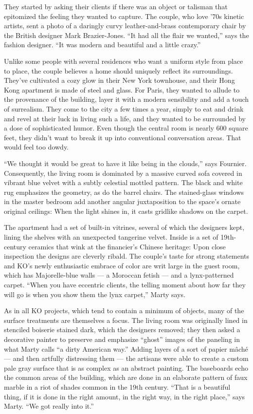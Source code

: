 They started by asking their clients if there was an object or talisman
that epitomized the feeling they wanted to capture. The couple, who love
'70s kinetic artists, sent a photo of a daringly curvy leather-and-brass
contemporary chair by the British designer Mark Brazier-Jones. ``It had
all the flair we wanted,'' says the fashion designer. ``It was modern
and beautiful and a little crazy.''

Unlike some people with several residences who want a uniform style from
place to place, the couple believes a home should uniquely reflect its
surroundings. They've cultivated a cozy glow in their New York
townhouse, and their Hong Kong apartment is made of steel and glass. For
Paris, they wanted to allude to the provenance of the building, layer it
with a modern sensibility and add a touch of surrealism. They come to
the city a few times a year, simply to eat and drink and revel at their
luck in living such a life, and they wanted to be surrounded by a dose
of sophisticated humor. Even though the central room is nearly 600
square feet, they didn't want to break it up into conventional
conversation areas. That would feel too dowdy.

``We thought it would be great to have it like being in the clouds,''
says Fournier. Consequently, the living room is dominated by a massive
curved sofa covered in vibrant blue velvet with a subtly celestial
mottled pattern. The black and white rug emphasizes the geometry, as do
the barrel chairs. The stained-glass windows in the master bedroom add
another angular juxtaposition to the space's ornate original ceilings:
When the light shines in, it casts gridlike shadows on the carpet.

The apartment had a set of built-in vitrines, several of which the
designers kept, lining the shelves with an unexpected tangerine velvet.
Inside is a set of 19th-century ceramics that wink at the financier's
Chinese heritage: Upon close inspection the designs are cleverly ribald.
The couple's taste for strong statements and KO's newly enthusiastic
embrace of color are writ large in the guest room, which has
Majorelle-blue walls --- a Moroccan fetish --- and a lynx-patterned
carpet. ``When you have eccentric clients, the telling moment about how
far they will go is when you show them the lynx carpet,'' Marty says.

As in all KO projects, which tend to contain a minimum of objects, many
of the surface treatments are themselves a focus. The living room was
originally lined in stenciled boiserie stained dark, which the designers
removed; they then asked a decorative painter to preserve and emphasize
``ghost'' images of the paneling in what Marty calls ``a dirty American
way.'' Adding layers of a sort of papier mâché --- and then artfully
distressing them --- the artisans were able to create a custom pale gray
surface that is as complex as an abstract painting. The baseboards echo
the common areas of the building, which are done in an elaborate pattern
of faux marble in a riot of shades common in the 19th century. ``That is
a beautiful thing, if it is done in the right amount, in the right way,
in the right place,'' says Marty. ``We got really into it.''

